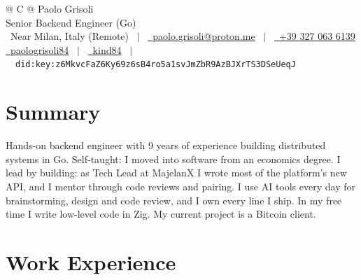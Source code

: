 \documentclass[a4paper,10pt]{article}
\begin{document}
\pagestyle{empty}
\setlength{\parskip}{2pt}

\begin{tabularx}{\linewidth}{@{} C @{}}
\Huge{Paolo Grisoli} \\[6pt]
\large Senior Backend Engineer (Go) \\[5pt]
\raisebox{-0.05\height}\faMapMarker*\ Near Milan, Italy (Remote) \ $|$ \
\href{mailto:paolo.grisoli@proton.me}{\raisebox{-0.05\height}\faEnvelope \ paolo.grisoli@proton.me} \ $|$ \
\href{tel:+393270636139}{\raisebox{-0.05\height}\faMobile \ +39 327 063 6139} \\[2pt]
\href{https://www.linkedin.com/in/paologrisoli84/}{\raisebox{-0.05\height}\faLinkedin\ paologrisoli84} \ $|$ \
\href{https://github.com/kind84}{\raisebox{-0.05\height}\faGithub\ kind84} \ $|$ \
\raisebox{-0.05\height}\faSeedling\ {\small\texttt{did:key:z6MkvcFaZ6Ky69z6sB4ro5a1svJmZbR9AzBJXrTS3DSeUeqJ}} \\
\end{tabularx}

\section{Summary}
Hands-on backend engineer with 9 years of experience building distributed systems in Go.
Self-taught: I moved into software from an economics degree.
I lead by building: as Tech Lead at MajelanX I wrote most of the platform's new API,
and I mentor through code reviews and pairing.
I use AI tools every day for brainstorming, design and code review, and I own every line I ship.
In my free time I write low-level code in Zig. My current project is a Bitcoin client.

\section{Work Experience}
\end{document}
